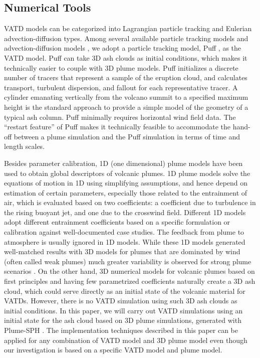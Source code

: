 \documentclass[draft,linenumbers]{agujournal2019}
\begin{document}
\subsection{Numerical Tools}
VATD models can be categorized into Lagrangian particle tracking and Eulerian advection-diffusion types. Among several available particle tracking models \citep[e.g.][]{walko1995hypact, searcy1998puff, d1998modeling, draxler1998overview} and advection-diffusion models \citep[e.g.][]{bonadonna2005total, folch2009fall3d, schwaiger2012ash3d}, we adopt a particle tracking model, Puff \citep{tanaka1991development,searcy1998puff}, as the VATD model. Puff can take 3D ash clouds as initial conditions, which makes it technically easier to couple with 3D plume models. Puff initializes a discrete number of tracers that represent a sample of the eruption cloud, and calculates transport, turbulent dispersion, and fallout for each representative tracer. A cylinder emanating vertically from the volcano summit to a specified maximum height is the standard approach to provide a simple model of the geometry of a typical ash column. Puff minimally requires horizontal wind field data. The ``restart feature'' of Puff makes it technically feasible to accommodate the hand-off between a plume simulation and the Puff simulation in terms of time and length scales.

Besides parameter calibration, 1D (one dimensional) plume models have been used to obtain global descriptors of volcanic plumes. 1D plume models \citep [e.g.][]{woods1988fluid, bursik2001effect, mastin2007user, de2015plume, folch2016fplume, pouget2016sensitivity} solve the equations of motion in 1D using simplifying assumptions, and hence depend on estimation of certain parameters, especially those related to the entrainment of air, which is evaluated based on two coefficients: a coefficient due to turbulence in the rising buoyant jet, and one due to the crosswind field. Different 1D models adopt different entrainment coefficients based on a specific formulation or calibration against well-documented case studies. The feedback from plume to atmosphere is usually ignored in 1D models. While these 1D models generated well-matched results with 3D models for plumes that are dominated by wind (often called weak plumes) much greater variability is observed for strong plume scenarios \citep{costa2016results}. On the other hand, 3D numerical models for volcanic plumes based on first principles and having few parametrized coefficients \citep{oberhuber1998volcanic, neri2003multiparticle, suzuki2005numerical, cerminara2016ashee, cao2018plume} naturally create a 3D ash cloud, which could serve directly as an initial state of the volcanic material for VATDs. However, there is no VATD simulation using such 3D ash clouds as initial conditions. In this paper, we will carry out VATD simulations using an initial state for the ash cloud based on 3D plume simulations, generated with Plume-SPH \citep{cao2018plume, cao2017data}. The implementation techniques described in this paper can be applied for any combination of VATD model and 3D plume model even though our investigation is based on a specific VATD model and plume model.
\end{document}
